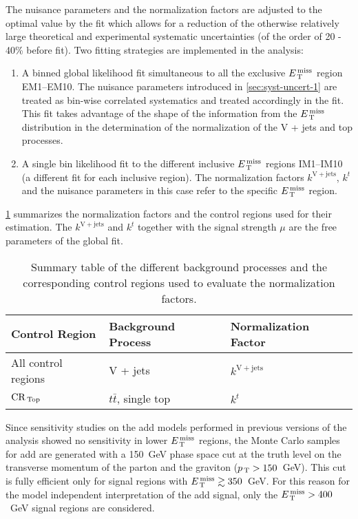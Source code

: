 The nuisance parameters and the normalization factors are adjusted to the
optimal value by the fit which allows for a reduction of the otherwise
relatively large theoretical and experimental systematic uncertainties (of the
order of 20 - 40\% before fit). Two fitting strategies are implemented in the
analysis:
\begin{enumerate}[A -]
\item A binned global likelihood fit simultaneous to all the exclusive $E_\mathrm{\, T}^\mathrm{\, miss}$
  region EM1--EM10. The nuisance parameters introduced in
  \cref{sec:syst-uncert-1} are treated as bin-wise correlated systematics and
  treated accordingly in the fit. This fit takes advantage of the shape of the
  information from the $E_\mathrm{\, T}^\mathrm{\, miss}$ distribution in the determination of the
  normalization of the V + jets and top processes.
\item A single bin likelihood fit to the different inclusive $E_\mathrm{\, T}^\mathrm{\, miss}$ regions
  IM1--IM10 (a different fit for each inclusive region). The normalization
  factors $k^\mathrm{V + jets}$, $k^t$ and the nuisance parameters in this case
  refer to the specific $E_\mathrm{\, T}^\mathrm{\, miss}$ region.
\end{enumerate}
\cref{tab:norm_factors_2016} summarizes the normalization factors and the
control regions used for their estimation. The $k^\mathrm{V + jets}$ and $k^t$
together with the signal strength $\mu$ are the free parameters of the global
fit.
\begin{table}[!h]
  \centering
  \begin{tabular}{lll}
    \toprule
    Control Region & Background Process & Normalization Factor \\
    \midrule \midrule
    All control regions & V + jets & $k^\mathrm{V + jets}$ \\
    $\mathrm{CR}_\mathrm{\, Top}$ & $t \bar{t}$, single top & $k^t$ \\
    \bottomrule
  \end{tabular}
  \caption{Summary table of the different background processes and the
    corresponding control regions used to evaluate the normalization factors.}
  \label{tab:norm_factors_2016}
\end{table}

Since sensitivity studies on the \gls{add} models performed in previous versions
of the analysis showed no sensitivity in lower $E_\mathrm{\, T}^\mathrm{\, miss}$ regions, the Monte Carlo
samples for \gls{add} are generated with a 150~GeV phase space cut at the truth
level on the transverse momentum of the parton and the graviton
($p_\mathrm{\, T} > 150$~GeV). This cut is fully efficient only for signal regions with
$E_\mathrm{\, T}^\mathrm{\, miss} \gtrsim 350$~GeV. For this reason for the model independent interpretation
of the \gls{add} signal, only the $E_\mathrm{\, T}^\mathrm{\, miss} > 400$~GeV signal regions are
considered.
